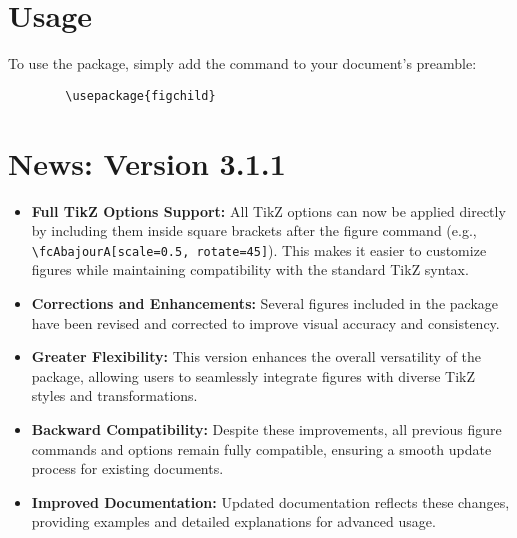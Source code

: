 \documentclass[x11names]{article}
\begin{document}
	
	
	
	
	\section{Usage}
	
	\hspace{\parindent}To use the package, simply add the command to your document's preamble:
	
	\begin{verbatim}
		\usepackage{figchild}
	\end{verbatim}
	
	
	\section*{News: Version 3.1.1}
	
	\begin{itemize}
		\item \textbf{Full TikZ Options Support:} All TikZ options can now be applied directly by including them inside square brackets after the figure command (e.g., \verb|\fcAbajourA[scale=0.5, rotate=45]|). This makes it easier to customize figures while maintaining compatibility with the standard TikZ syntax.
		
		\item \textbf{Corrections and Enhancements:} Several figures included in the package have been revised and corrected to improve visual accuracy and consistency.
		
		\item \textbf{Greater Flexibility:} This version enhances the overall versatility of the package, allowing users to seamlessly integrate figures with diverse TikZ styles and transformations.
		
		\item \textbf{Backward Compatibility:} Despite these improvements, all previous figure commands and options remain fully compatible, ensuring a smooth update process for existing documents.
		
		\item \textbf{Improved Documentation:} Updated documentation reflects these changes, providing examples and detailed explanations for advanced usage.
	\end{itemize}
	
\end{document}
